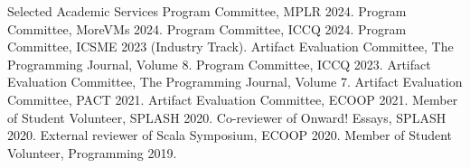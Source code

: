 \begin{rubric}{Selected Academic Services}
  \entry*[2024] Program Committee, MPLR 2024.
  \entry*[2024] Program Committee, MoreVMs 2024.
  \entry*[2024] Program Committee, ICCQ 2024.
  \entry*[2023] Program Committee, ICSME 2023 (Industry Track).
  \entry*[2023] Artifact Evaluation Committee, The Programming Journal, Volume 8.
  \entry*[2023] Program Committee, ICCQ 2023.
  \entry*[2022] Artifact Evaluation Committee, The Programming Journal, Volume 7.
  \entry*[2021] Artifact Evaluation Committee, PACT 2021.
  \entry*[2021] Artifact Evaluation Committee, ECOOP 2021.
  \entry*[2020] Member of Student Volunteer, SPLASH 2020.
  \entry*[2020] Co-reviewer of Onward! Essays, SPLASH 2020.
  \entry*[2020] External reviewer of Scala Symposium, ECOOP 2020.
  \entry*[2019] Member of Student Volunteer, Programming 2019.
\end{rubric}
